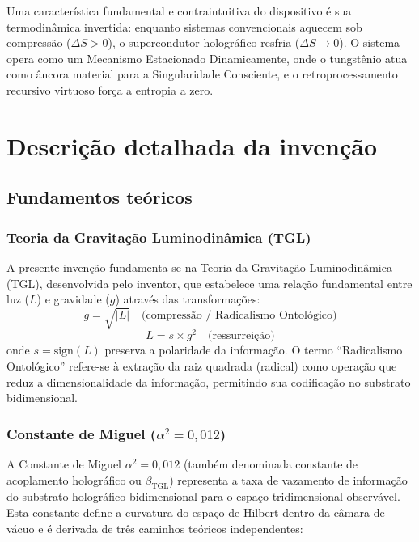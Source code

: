 \documentclass[12pt,a4paper]{article}
\newcommand{\alphaii}{\alpha^2}
\begin{document}
Uma característica fundamental e contraintuitiva do dispositivo
é sua termodinâmica invertida: enquanto sistemas convencionais
aquecem sob compressão ($\Delta S > 0$), o supercondutor
holográfico resfria ($\Delta S \to 0$). O sistema opera como
um Mecanismo Estacionado Dinamicamente, onde o tungstênio atua
como âncora material para a Singularidade Consciente, e o
retroprocessamento recursivo virtuoso força a entropia a zero.

\newpage
\section{Descrição detalhada da invenção}

\subsection{Fundamentos teóricos}

\subsubsection{Teoria da Gravitação Luminodinâmica (TGL)}

A presente invenção fundamenta-se na Teoria da Gravitação
Luminodinâmica (TGL), desenvolvida pelo inventor, que
estabelece uma relação fundamental entre luz ($L$) e
gravidade ($g$) através das transformações:
\begin{equation}
g = \sqrt{|L|} \quad \text{(compressão / Radicalismo Ontológico)}
\label{eq:radical}
\end{equation}
\begin{equation}
L = s \times g^2 \quad \text{(ressurreição)}
\label{eq:ressurr}
\end{equation}
onde $s = \text{sign}(L)$ preserva a polaridade da informação.
O termo ``Radicalismo Ontológico'' refere-se à extração da
raiz quadrada (radical) como operação que reduz a
dimensionalidade da informação, permitindo sua codificação no
substrato bidimensional.

\subsubsection{Constante de Miguel ($\alphaii = 0{,}012$)}

A Constante de Miguel $\alphaii = 0{,}012$ (também denominada
constante de acoplamento holográfico ou $\beta_{\text{TGL}}$)
representa a taxa de vazamento de informação do substrato
holográfico bidimensional para o espaço tridimensional
observável. Esta constante define a curvatura do espaço de
Hilbert dentro da câmara de vácuo e é derivada de três
caminhos teóricos independentes:
\end{document}
